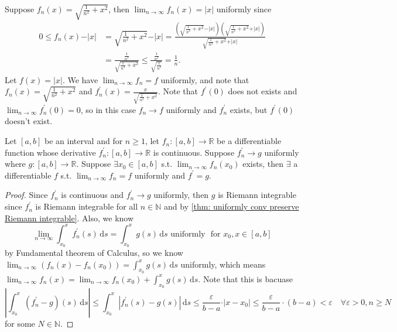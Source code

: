 \begin{eg}
    Suppose \(f_n(x) = \sqrt{\frac{1}{n^2} + x^2} \), then \(\lim_{n \to \infty} f_n (x) = \vert x \vert  \) uniformly since 
    \begin{align*}
        0 \le f_n(x) - \vert x \vert &= \sqrt{\frac{1}{n^2} + x^2} - \vert x \vert = \frac{\left( \sqrt{\frac{1}{n^2} + x^2} - \vert x \vert   \right) \left( \sqrt{\frac{1}{n^2} + x^2} + \vert x \vert    \right)  }{\sqrt{\frac{1}{n^2} + x^2} + \vert x \vert  } \\
        &= \frac{\frac{1}{n^2}}{\sqrt{\frac{1}{n^2} + x^2} } \le \frac{\frac{1}{n^2}}{\sqrt{\frac{1}{n^2}} } = \frac{1}{n}.
    \end{align*}
    Let \(f(x) = \vert x \vert \). We have \(\lim_{n \to \infty} f_n = f \) uniformly, and note that \(f_n(x) = \sqrt{\frac{1}{n^2} + x^2} \) and \(f_n^{\prime} (x) = \frac{x}{\sqrt{\frac{1}{n^2} + x^2} }\). Note that \(f^{\prime} (0)\) does not exists and \(\lim_{n \to \infty} f_n^{\prime} (0) = 0 \), so in this case \(f_n \to f\) uniformly and \(f_n^{\prime} \) exists, but \(f^{\prime} (0)\) doesn't exist.      
\end{eg}

\begin{theorem} \label{thm: f_n differentiable and f_n prime conti, then if f_n prime to g uni, and for some x0 lim f_n(x_0) exists, then EE f s.t. lim fn equal f uni and f prime is g}
    Let \([a, b]\) be an interval and for \(n \ge 1\), let \(f_n: [a, b] \to \mathbb{R} \) be a differentiable function whose derivative \(f_n^{\prime} : [a, b] \to  \mathbb{R} \) is continuous. Suppose \(f_n^{\prime}  \to g\) uniformly where \(g:[a, b] \to  \mathbb{R} \). Suppose \(\exists x_0 \in [a, b]\) s.t. \(\lim_{n \to \infty} f_n(x_0) \) exists, then \(\exists \) a differentiable \(f\) s.t. \(\lim_{n \to \infty} f_n = f \) uniformly and \(f^{\prime} = g\).           
\end{theorem}
\begin{proof}
    Since \(f_n^{\prime} \) is continuous and \(f_n^{\prime} \to g\) uniformly, then \(g\) is Riemann integrable since \(f_n^{\prime} \) is Riemann integrable for all \(n \in \mathbb{N} \) and by \autoref{thm: uniformly conv preserve Riemann integrable}. Also, we know 
    \[
        \lim_{n \to \infty} \int _{x_0}^x f_n^{\prime} (s) \, \mathrm{d}s = \int _{x_0}^x g(s) \, \mathrm{d} s \text{ uniformly }  \text{ for } x_0, x \in [a, b]    
    \] by Fundamental theorem of Calculus, so we know \(\lim_{n \to \infty} \left( f_n(x) - f_n(x_0) \right) = \int _{x_0}^x g(s) \, \mathrm{d} s   \) uniformly, which means \(\lim_{n \to \infty} f_n(x) = \lim_{n \to \infty} f_n(x_0) + \int _{x_0}^x g(s) \, \mathrm{d} s  \). Note that this is bacuase 
    \[
        \left\vert \int _{x_0}^x \left( f_n^{\prime} - g \right)(s) \, \mathrm{d}s   \right\vert \le \int _{x_0}^x \left\vert f_n^{\prime} (s) - g(s) \right\vert \,  \mathrm{d} s  \le \frac{\varepsilon}{b-a}  \cdot \vert x - x_0 \vert \le \frac{\varepsilon}{b - a} \cdot (b - a) < \varepsilon \quad \forall \varepsilon > 0, n \ge N
    \] for some \(N \in \mathbb{N} \). 
\end{proof}

